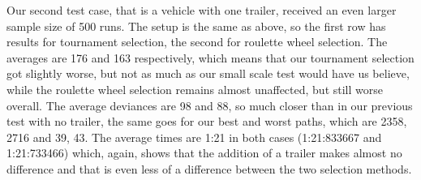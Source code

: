 Our second test case, that is a vehicle with one trailer, received an even larger sample size of 500 runs. The setup is the same as above, so the first row has results for tournament selection, the second for roulette wheel selection. The averages are 176 and 163 respectively, which means that our tournament selection got slightly worse, but not as much as our small scale test would have us believe, while the roulette wheel selection remains almost unaffected, but still worse overall. The average deviances are 98 and 88, so much closer than in our previous test with no trailer, the same goes for our best and worst paths, which are 2358, 2716 and 39, 43. The average times are 1:21 in both cases (1:21:833667 and 1:21:733466) which, again, shows that the addition of a trailer makes almost no difference and that is even less of a difference between the two selection methods.